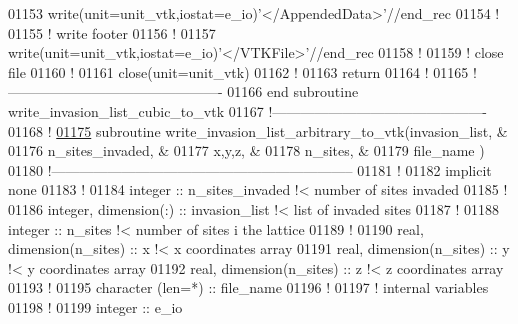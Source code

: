 \begin{DoxyCode}
01153 \textcolor{keyword}{write}(unit=unit\_vtk,iostat=e\_io)\textcolor{stringliteral}{'</AppendedData>'}//end\_rec
01154 \textcolor{comment}{!}
01155 \textcolor{comment}{! write footer}
01156 \textcolor{comment}{!}
01157 \textcolor{keyword}{write}(unit=unit\_vtk,iostat=e\_io)\textcolor{stringliteral}{'</VTKFile>'}//end\_rec
01158 \textcolor{comment}{!}
01159 \textcolor{comment}{! close file}
01160 \textcolor{comment}{!}
01161 \textcolor{keyword}{close}(unit=unit\_vtk)
01162 \textcolor{comment}{!}
01163 return
01164 \textcolor{comment}{!}
01165 \textcolor{comment}{!----------------------------------------------}
01166 \textcolor{keyword}{end subroutine write\_invasion\_list\_cubic\_to\_vtk}
01167 \textcolor{comment}{!----------------------------------------------}
01168 \textcolor{comment}{!}
\hypertarget{module__write__output__files_8f90_source_l01175}{}\hyperlink{classmodule__write__output__files_a198db49650f507f17b302215e61995cc}{01175} \textcolor{keyword}{subroutine }write\_invasion\_list\_arbitrary\_to\_vtk(invasion\_list,   &
01176                                                 n\_sites\_invaded, &
01177                                                 x,y,z,           &
01178                                                 n\_sites,         &
01179                                                 file\_name        )        
01180 \textcolor{comment}{!-----------------------------------------------------------------}
01181 \textcolor{comment}{!}
01182 \textcolor{keyword}{implicit none}
01183 \textcolor{comment}{!}
01184 \textcolor{keywordtype}{integer} :: n\_sites\_invaded \textcolor{comment}{!< number of sites invaded}
01185 \textcolor{comment}{!}
01186 \textcolor{keywordtype}{integer}, \textcolor{keywordtype}{dimension(:)} :: invasion\_list \textcolor{comment}{!< list of invaded sites}
01187 \textcolor{comment}{!}
01188 \textcolor{keywordtype}{integer} :: n\_sites \textcolor{comment}{!< number of sites i the lattice}
01189 \textcolor{comment}{!}
01190 \textcolor{keywordtype}{real}, \textcolor{keywordtype}{dimension(n\_sites)} :: x \textcolor{comment}{!< x coordinates array}
01191 \textcolor{keywordtype}{real}, \textcolor{keywordtype}{dimension(n\_sites)} :: y \textcolor{comment}{!< y coordinates array}
01192 \textcolor{keywordtype}{real}, \textcolor{keywordtype}{dimension(n\_sites)} :: z \textcolor{comment}{!< z coordinates array}
01193 \textcolor{comment}{!}
01195 \textcolor{keywordtype}{character (len=*)} :: file\_name
01196 \textcolor{comment}{!}
01197 \textcolor{comment}{! internal variables}
01198 \textcolor{comment}{!}
01199 \textcolor{keywordtype}{integer} :: e\_io

\end{DoxyCode}
